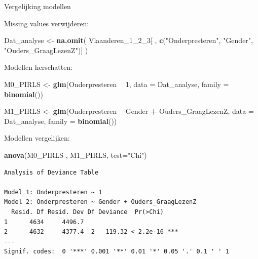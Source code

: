 \documentclass[
  10pt,
  ignorenonframetext,
]{beamer}
\newenvironment{Shaded}{\begin{snugshade}}{\end{snugshade}}
\newcommand{\DataTypeTok}[1]{\textcolor[rgb]{0.13,0.29,0.53}{#1}}
\newcommand{\DecValTok}[1]{\textcolor[rgb]{0.00,0.00,0.81}{#1}}
\newcommand{\KeywordTok}[1]{\textcolor[rgb]{0.13,0.29,0.53}{\textbf{#1}}}
\newcommand{\NormalTok}[1]{#1}
\newcommand{\OperatorTok}[1]{\textcolor[rgb]{0.81,0.36,0.00}{\textbf{#1}}}
\newcommand{\StringTok}[1]{\textcolor[rgb]{0.31,0.60,0.02}{#1}}
\begin{document}
\begin{frame}[fragile]{Vergelijking modellen}
\protect\hypertarget{vergelijking-modellen}{}

Missing values verwijderen: \tiny

\begin{Shaded}
\begin{Highlighting}[]
\NormalTok{Dat_analyse <-}\StringTok{ }\KeywordTok{na.omit}\NormalTok{( Vlaanderen_}\DecValTok{1}\NormalTok{_}\DecValTok{2}\NormalTok{_}\DecValTok{3}\NormalTok{[ , }\KeywordTok{c}\NormalTok{(}\StringTok{"Onderpresteren"}\NormalTok{, }\StringTok{"Gender"}\NormalTok{, }\StringTok{"Ouders_GraagLezenZ"}\NormalTok{)] )}
\end{Highlighting}
\end{Shaded}

\normalsize \medskip     Modellen herschatten: \tiny

\begin{Shaded}
\begin{Highlighting}[]
\NormalTok{M0_PIRLS <-}\StringTok{ }\KeywordTok{glm}\NormalTok{(Onderpresteren }\OperatorTok{~}\StringTok{ }\DecValTok{1}\NormalTok{, }
                \DataTypeTok{data =}\NormalTok{ Dat_analyse, }\DataTypeTok{family =} \KeywordTok{binomial}\NormalTok{())}

\NormalTok{M1_PIRLS <-}\StringTok{ }\KeywordTok{glm}\NormalTok{(Onderpresteren }\OperatorTok{~}\StringTok{ }\NormalTok{Gender }\OperatorTok{+}\StringTok{ }\NormalTok{Ouders_GraagLezenZ, }
                \DataTypeTok{data =}\NormalTok{ Dat_analyse, }\DataTypeTok{family =} \KeywordTok{binomial}\NormalTok{())}
\end{Highlighting}
\end{Shaded}

\normalsize \medskip Modellen vergelijken: \tiny

\begin{Shaded}
\begin{Highlighting}[]
\KeywordTok{anova}\NormalTok{(M0_PIRLS , M1_PIRLS, }\DataTypeTok{test=}\StringTok{"Chi"}\NormalTok{)}
\end{Highlighting}
\end{Shaded}

\begin{verbatim}
Analysis of Deviance Table

Model 1: Onderpresteren ~ 1
Model 2: Onderpresteren ~ Gender + Ouders_GraagLezenZ
  Resid. Df Resid. Dev Df Deviance  Pr(>Chi)    
1      4634     4496.7                          
2      4632     4377.4  2   119.32 < 2.2e-16 ***
---
Signif. codes:  0 '***' 0.001 '**' 0.01 '*' 0.05 '.' 0.1 ' ' 1
\end{verbatim}

\normalsize

\end{frame}
\end{document}
